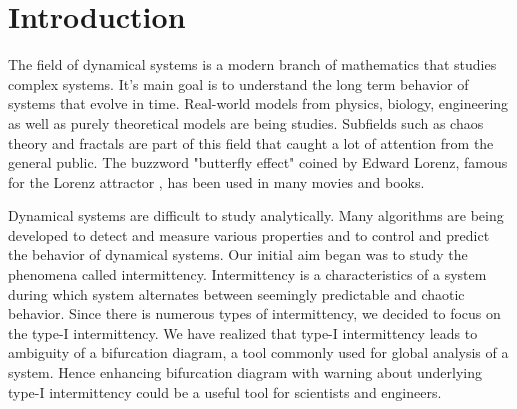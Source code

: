 \chapter{Introduction}
\label{sec:Introduction}

The field of dynamical systems is a modern branch of mathematics that studies complex systems.
It's main goal is to understand the long term behavior of systems that evolve in time.
Real-world models from physics, biology, engineering as well as purely theoretical models are being studies.
Subfields such as chaos theory and fractals are part of this field that caught a lot of attention from the general public.
The buzzword "butterfly effect" coined by Edward Lorenz, famous for the Lorenz attractor \cite{Lorenz2004}, has been used in many movies and books.
\par
Dynamical systems are difficult to study analytically.
Many algorithms are being developed to detect and measure various properties and to control and predict the behavior of dynamical systems.
Our initial aim began was to study the phenomena called intermittency.
Intermittency is a characteristics of a system during which system alternates between seemingly predictable and chaotic behavior.
Since there is numerous types of intermittency, we decided to focus on the type-I intermittency.
We have realized that type-I intermittency leads to ambiguity of a bifurcation diagram, a tool commonly used for global analysis of a system.
Hence enhancing bifurcation diagram with warning about underlying type-I intermittency could be a useful tool for scientists and engineers.


\endinput